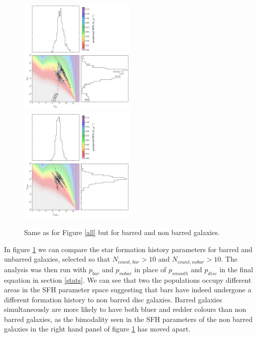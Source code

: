 \documentclass{mn2e}
\begin{document}
\begin{figure}
\includegraphics[width=0.4975\textwidth]{bars.pdf}
\includegraphics[width=0.4975\textwidth]{no_bars.pdf}
\caption{Same as for Figure \ref{all} but for barred and non barred galaxies.}
\label{bars}
\end{figure}

In figure \ref{bars} we can compare the star formation history parameters for barred and unbarred galaxies, selected so that $N_{count, bar} > 10$ and $N_{count, no bar} > 10$. The analysis was then run with $p_{bar}$ and $p_{no bar}$ in place of $p_{smooth}$ and $p_{disc}$ in the final equation in section \ref{stats}. We can see that two the populations occupy different areas in the SFH parameter space suggesting that bars have indeed undergone a different formation history to non barred disc galaxies.  Barred galaxies simultaneously are more likely to have both bluer and redder colours than non barred galaxies, as the bimodality seen in the SFH parameters of the non barred galaxies in the right hand panel of figure \ref{bars} has moved apart. 
\end{document}
